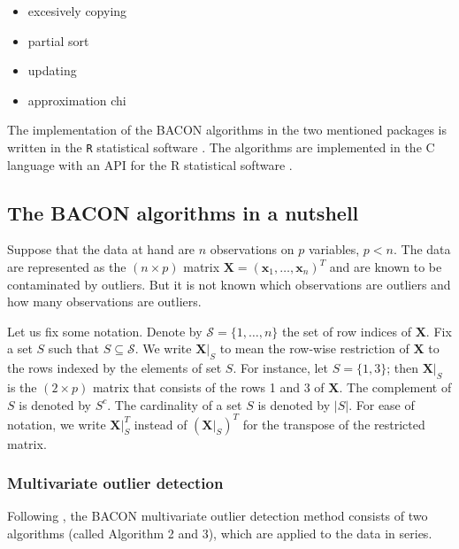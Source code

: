 \documentclass[a4paper,oneside,11pt,DIV=12]{scrartcl}
\newcommand{\code}[1]{{\texttt{#1}}}
\begin{document}
\begin{itemize}
	\item excesively copying
\end{itemize}
 

\begin{itemize}
	\item partial sort
	\item updating
	\item approximation chi 
\end{itemize}
 
The implementation of the BACON algorithms in the two mentioned packages is written in the \code{R} statistical software \citep{r-development-core-team_2020}.
The algorithms are implemented in the C language with an API for the R statistical software .



\subsection{The BACON algorithms in a nutshell}\label{sec:nutshell} 
Suppose that the data at hand are $n$ observations on $p$ variables, $p < n$. The data are represented as the $(n \times p)$ matrix $\bm X = (\bm x_1, \ldots, \bm x_n)^T$ and are known to be contaminated by outliers. But it is not known which observations are outliers and how many observations are outliers.   

Let us fix some notation. Denote by $\mathscr{S}=\{1, \ldots, n\}$ the set of row indices of $\bm X$. Fix a set $S$ such that $S \subseteq \mathscr{S}$. We write $\bm X \vert_{S}$ to mean the row-wise restriction of $\bm X$ to the rows indexed by the elements of set $S$. For instance, let $S=\{1,3\}$; then $\bm X \vert_{S}$ is the $(2 \times p)$ matrix that consists of the rows 1 and 3 of $\bm X$. The complement of $S$ is denoted by $S^c$. The cardinality of a set $S$ is denoted by $\vert S \vert$. For ease of notation, we write $\bm X \vert_S^T$ instead of $(\bm X \vert_S)^T$ for the transpose of the restricted matrix. 

\subsubsection{Multivariate outlier detection} 
Following \citet{billor_hadi_etal_2000}, the BACON multivariate outlier detection method consists of two algorithms (called Algorithm 2 and 3), which are applied to the data in series. 
\end{document}
